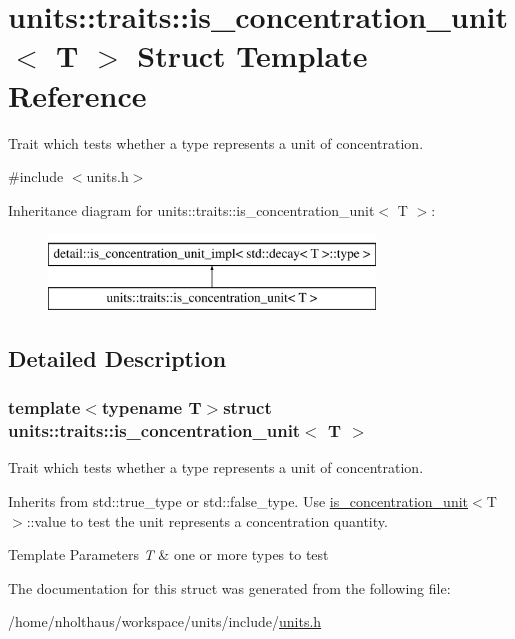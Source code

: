 \hypertarget{structunits_1_1traits_1_1is__concentration__unit}{}\section{units\+:\+:traits\+:\+:is\+\_\+concentration\+\_\+unit$<$ T $>$ Struct Template Reference}
\label{structunits_1_1traits_1_1is__concentration__unit}


Trait which tests whether a type represents a unit of concentration.  




{\ttfamily \#include $<$units.\+h$>$}

Inheritance diagram for units\+:\+:traits\+:\+:is\+\_\+concentration\+\_\+unit$<$ T $>$\+:\begin{figure}[H]
\begin{center}
\leavevmode
\includegraphics[height=2.000000cm]{structunits_1_1traits_1_1is__concentration__unit}
\end{center}
\end{figure}


\subsection{Detailed Description}
\subsubsection*{template$<$typename T$>$struct units\+::traits\+::is\+\_\+concentration\+\_\+unit$<$ T $>$}

Trait which tests whether a type represents a unit of concentration. 

Inherits from {\ttfamily std\+::true\+\_\+type} or {\ttfamily std\+::false\+\_\+type}. Use {\ttfamily \hyperlink{structunits_1_1traits_1_1is__concentration__unit}{is\+\_\+concentration\+\_\+unit}$<$T$>$\+::value} to test the unit represents a concentration quantity. 
\begin{DoxyTemplParams}{Template Parameters}
{\em T} & one or more types to test \\
\hline
\end{DoxyTemplParams}


The documentation for this struct was generated from the following file\+:\begin{DoxyCompactItemize}
\item 
/home/nholthaus/workspace/units/include/\hyperlink{units_8h}{units.\+h}\end{DoxyCompactItemize}
